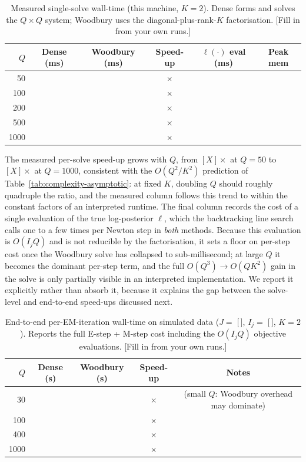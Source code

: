 \iffalse
\begin{table}[H]
\centering
\caption{Measured single-solve wall-time (this machine, $K=2$). Dense forms and
solves the $Q\times Q$ system; Woodbury uses the diagonal-plus-rank-$K$ factorisation.
[Fill in from your own runs.]}
\label{tab:solve-timing}
\begin{tabular}{@{}rccccc@{}}
\toprule
$Q$ & Dense (ms) & Woodbury (ms) & Speed-up & $\ell(\cdot)$ eval (ms) & Peak mem \\
\midrule
50   & \phantom{000.00} & \phantom{00.00} & \phantom{000}$\times$ & \phantom{0.00} & \\
100  &  &  & $\times$ &  & \\
200  &  &  & $\times$ &  & \\
500  &  &  & $\times$ &  & \\
1000 &  &  & $\times$ &  & \\
\bottomrule
\end{tabular}
\end{table}

The measured per-solve speed-up grows with $Q$, from $[X]\times$ at $Q=50$ to $[X]\times$ at
$Q=1000$, consistent with the $O(Q^2/K^2)$ prediction of
Table~\ref{tab:complexity-asymptotic}: at fixed $K$, doubling $Q$ should roughly quadruple the
ratio, and the measured column follows this trend to within the constant factors of an
interpreted runtime. The final column records the cost of a single evaluation of the
true log-posterior $\ell$, which the backtracking line search calls one to a few times per
Newton step in \emph{both} methods. Because this evaluation is $O(I_jQ)$ and is not reducible
by the factorisation, it sets a floor on per-step cost once the Woodbury solve has collapsed
to sub-millisecond; at large $Q$ it becomes the dominant per-step term, and the full
$O(Q^3)\!\to\!O(QK^2)$ gain in the solve is only partially visible in an interpreted
implementation. We report it explicitly rather than absorb it, because it explains the gap
between the solve-level and end-to-end speed-ups discussed next.

\begin{table}[H]
\centering
\caption{End-to-end per-EM-iteration wall-time on simulated data
($J=\;$[\,], $I_j=\;$[\,], $K=2$). Reports the full E-step + M-step cost including
the $O(I_jQ)$ objective evaluations. [Fill in from your own runs.]}
\label{tab:endtoend-timing}
\begin{tabular}{@{}rcccc@{}}
\toprule
$Q$ & Dense (s) & Woodbury (s) & Speed-up & Notes \\
\midrule
30   &  &  & $\times$ & (small $Q$: Woodbury overhead may dominate) \\
100  &  &  & $\times$ & \\
400  &  &  & $\times$ & \\
1000 &  &  & $\times$ & \\
\bottomrule
\end{tabular}
\end{table}

